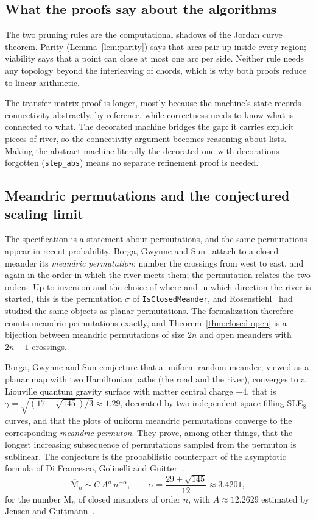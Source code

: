 \documentclass[11pt]{amsart}
\theoremstyle{definition}
\theoremstyle{remark}
\newcommand{\Closed}{\overline{\mathrm{M}}}
\newcommand{\code}[1]{\texttt{#1}}
\begin{document}
\subsection{What the proofs say about the algorithms}
The two pruning rules are the computational shadows of the Jordan curve theorem. Parity
(Lemma~\ref{lem:parity}) says that arcs pair up inside every region; viability says that a
point can close at most one arc per side. Neither rule needs any topology beyond the
interleaving of chords, which is why both proofs reduce to linear arithmetic.

The transfer-matrix proof is longer, mostly because the machine's state records connectivity
abstractly, by reference, while correctness needs to know what is connected to what. The
decorated machine bridges the gap: it carries explicit pieces of river, so the connectivity
argument becomes reasoning about lists. Making the abstract machine literally the decorated one
with decorations forgotten (\code{step\_abs}) means no separate refinement proof is needed.

\subsection{Meandric permutations and the conjectured scaling limit}\label{sec:permutons}
The specification is a statement about permutations, and the same permutations appear in recent
probability. Borga, Gwynne and Sun~\cite{bgs} attach to a closed meander its \emph{meandric
permutation}: number the crossings from west to east, and again in the order in which the
river meets them; the permutation relates the two orders. Up to inversion and the choice of
where and in which direction the river is started, this is the permutation $\sigma$ of
\code{IsClosedMeander}, and Rosenstiehl~\cite{rosenstiehl84} had studied the same objects as
planar permutations. The formalization therefore counts meandric permutations exactly, and
Theorem~\ref{thm:closed-open} is a bijection between meandric permutations of size $2n$ and
open meanders with $2n-1$ crossings.

Borga, Gwynne and Sun conjecture that a uniform random meander, viewed as a planar map with two
Hamiltonian paths (the road and the river), converges to a Liouville quantum gravity surface
with matter central charge $-4$, that is $\gamma = \sqrt{(17-\sqrt{145})/3} \approx 1.29$,
decorated by two independent space-filling SLE$_8$ curves, and that the plots of uniform
meandric permutations converge to the corresponding \emph{meandric permuton}. They prove, among
other things, that the longest increasing subsequence of permutations sampled from the
permuton is sublinear. The conjecture is the probabilistic counterpart of the asymptotic formula
of Di Francesco, Golinelli and Guitter~\cite{dgg00},
\[ \Closed_n \sim C\, A^n\, n^{-\alpha}, \qquad \alpha = \frac{29+\sqrt{145}}{12} \approx 3.4201, \]
for the number $\Closed_n$ of closed meanders of order $n$, with $A \approx 12.2629$ estimated by
Jensen and Guttmann~\cite{jensen00,jensen-guttmann}.
\end{document}
